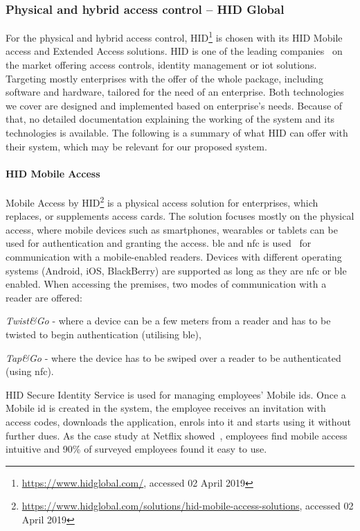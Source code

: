 \subsubsection{Physical and hybrid access control -- HID Global} \label{sec:pacs-hid}

For the physical and hybrid access control, HID\footnote{\url{https://www.hidglobal.com/}, accessed 02 April 2019} is chosen with its HID Mobile access and Extended Access solutions. HID is one of the leading companies~\cite{TopManufacturers} on the market offering access controls, identity management or \acrshort{iot} solutions. Targeting mostly enterprises with the offer of the whole package, including software and hardware, tailored for the need of an enterprise. Both technologies we cover are designed and implemented based on enterprise’s needs. Because of that, no detailed documentation explaining the working of the system and its technologies is available. The following is a summary of what HID can offer with their system, which may be relevant for our proposed system.

\paragraph{HID Mobile Access}
Mobile Access by HID\footnote{\url{https://www.hidglobal.com/solutions/hid-mobile-access-solutions}, accessed 02 April 2019} is a physical access solution for enterprises, which replaces, or supplements access cards. The solution focuses mostly on the physical access, where mobile devices such as smartphones, wearables or tablets can be used for authentication and granting the access. \acrshort{ble} and \acrshort{nfc} is used~\cite{HIDGlobal2014HIDGlobal} for communication with a mobile-enabled readers. Devices with different operating systems (Android, iOS, BlackBerry) are supported as long as they are \acrshort{nfc} or \acrshort{ble} enabled. When accessing the premises, two modes of communication with a reader are offered: 
%
\begin{enumerate*}[label=(\roman*)]
    \item \textit{Twist\&Go} - where a device can be a few meters from a reader and has to be twisted to begin authentication (utilising \acrshort{ble}),
    \item \textit{Tap\&Go} - where the device has to be swiped over a reader to be authenticated (using \acrshort{nfc}).
\end{enumerate*}
%
HID Secure Identity Service is used for managing employees’ Mobile \acrshort{id}s. Once a Mobile \acrshort{id} is created in the system, the employee receives an invitation with access codes, downloads the application, enrols into it and starts using it without further dues. As the case study at Netflix showed~\cite{2012NetflixPilot}, employees find mobile access intuitive and 90\% of surveyed employees found it easy to use.

